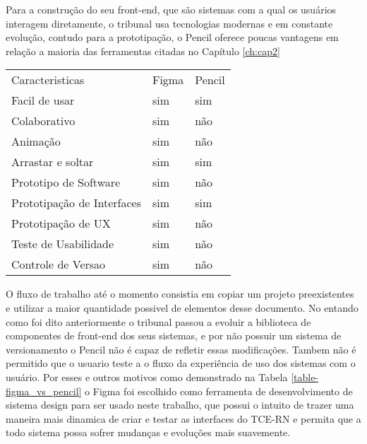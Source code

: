   Para a construção do seu front-end, que são sistemas com a qual os usuários interagem diretamente, o tribunal usa tecnologias modernas e em constante evolução, contudo para a prototipação, o Pencil oferece poucas vantagens em relação a maioria das ferramentas citadas no Capítulo \ref{ch:cap2}

  \begin{table*}[!ht]
    \centering
    \caption{Vantagens Figma e Pencil}
    \begin{tabular}{lll}
      
      \rowcolor[HTML]{AAAAAA}
      Caracteristicas             &
      Figma                       &
      Pencil                      \\
      \rowcolor[HTML]{DDDDDD}
      Facil de usar               &
      sim                         &
      sim                         \\
      Colaborativo                &
      sim                         &
      não                         \\
      \rowcolor[HTML]{DDDDDD}
      Animação                    &
      sim                         &
      não                         \\
      Arrastar e soltar           &
      sim                         &
      sim                         \\
      \rowcolor[HTML]{DDDDDD}
      Prototipo de Software       &
      sim                         &
      não                         \\
      Prototipação de Interfaces  &
      sim                         &
      sim                         \\
      \rowcolor[HTML]{DDDDDD}
      Prototipação de UX          &
      sim                         &
      não                         \\
      Teste de Usabilidade        &
      sim                         &
      não                         \\
      \rowcolor[HTML]{DDDDDD}
      Controle de Versao          &
      sim                         &
      não                         \\
    \end{tabular}
    \label{table-figma_vs_pencil}
  \end{table*}

  O fluxo de trabalho até o momento consistia em copiar um projeto preexistentes e utilizar a maior quantidade possivel de elementos desse documento. No entando como foi dito anteriormente o tribunal passou a evoluir a biblioteca de componentes de front-end dos seus sistemas, e por não possuir um sistema de versionamento o Pencil não é capaz de refletir essas modificações. Tambem não é permitido que o usuario teste a o fluxo da experiência de uso dos sistemas com o usuário. Por esses e outros motivos como demonstrado na Tabela \ref{table-figma_vs_pencil} o Figma foi escolhido como ferramenta de desenvolvimento de sistema design para ser usado neste trabalho, que possui o intuito de trazer uma maneira mais dinamica de criar e testar as interfaces do TCE-RN e permita que a todo sistema possa sofrer mudanças e evoluções mais suavemente.

